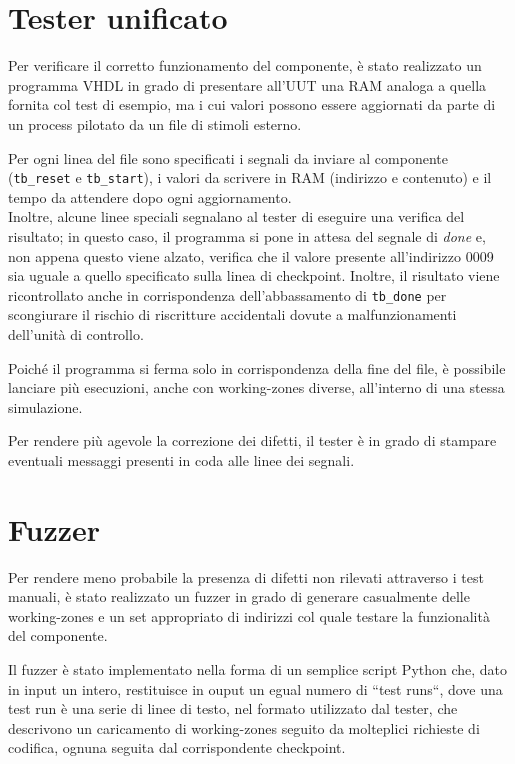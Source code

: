\documentclass[11pt,a4paper]{article}
\begin{document}
\newpage

\appendix
\section{Tester unificato}
\label{appendix:unitest}
Per verificare il corretto funzionamento del componente, è stato realizzato un programma VHDL in grado di presentare all'UUT una RAM analoga a quella
fornita col test di esempio, ma i cui valori possono essere aggiornati da parte di un process pilotato da un file di stimoli esterno.

Per ogni linea del file sono specificati i segnali da inviare al componente (\lstinline{tb_reset} e \lstinline{tb_start}), i valori da scrivere in RAM
(indirizzo e contenuto) e il tempo da attendere dopo ogni aggiornamento.\\
Inoltre, alcune linee speciali segnalano al tester di eseguire una verifica del risultato; in questo caso, il programma si pone in attesa del segnale di
\emph{done} e, non appena questo viene alzato, verifica che il valore presente all'indirizzo 0009 sia uguale a quello specificato sulla linea di
checkpoint. Inoltre, il risultato viene ricontrollato anche in corrispondenza dell'abbassamento di \lstinline{tb_done} per scongiurare il rischio di
riscritture accidentali dovute a malfunzionamenti dell'unità di controllo.

Poiché il programma si ferma solo in corrispondenza della fine del file, è possibile lanciare più esecuzioni, anche con working-zones diverse, all'interno
di una stessa simulazione.

Per rendere più agevole la correzione dei difetti, il tester è in grado di stampare eventuali messaggi presenti in coda alle linee dei segnali.

\section{Fuzzer}
\label{appendix:fuzzer}
Per rendere meno probabile la presenza di difetti non rilevati attraverso i test manuali, è stato realizzato un fuzzer in grado di generare casualmente
delle working-zones e un set appropriato di indirizzi col quale testare la funzionalità del componente.

Il fuzzer è stato implementato nella forma di un semplice script Python che, dato in input un intero, restituisce in ouput un egual numero di
``test runs``, dove una test run è una serie di linee di testo, nel formato utilizzato dal tester, che descrivono un caricamento di working-zones seguito
da molteplici richieste di codifica, ognuna seguita dal corrispondente checkpoint.
\end{document}
